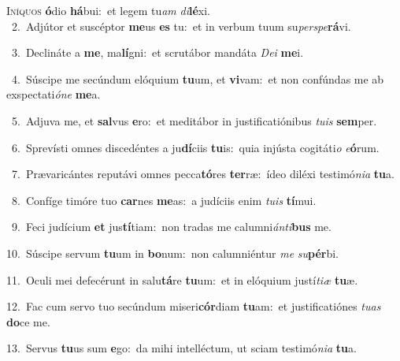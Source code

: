 \lettrine{\initial\textcolor{\initialcolor}{I}}{níquos} \textbf{ó}\-dio \textbf{há}\-bui:~\star et legem tu\textit{am} \textit{di}\-\textbf{lé}xi.\\
{\numbfont\textcolor{\numbcolor}{~2.}}~Adjútor et suscéptor \textbf{me}\-us \textbf{es} tu:~\star et in verbum tuum su\-\textit{per}\-\textit{spe}\textbf{rá}vi.\par
{\numbfont\textcolor{\numbcolor}{~3.}}~Declináte a \textbf{me}\-, ma\-\textbf{lí}\-gni:~\star et scrutábor mandáta \textit{De}\-\textit{i} \textbf{me}\-i.\par
{\numbfont\textcolor{\numbcolor}{~4.}}~Súscipe me secúndum elóquium \textbf{tu}\-um, et \textbf{vi}\-vam:~\star et non confúndas me ab exspectati\-\textit{ó}\-\textit{ne} \textbf{me}\-a.\par
{\numbfont\textcolor{\numbcolor}{~5.}}~Adjuva me, et \textbf{sal}\-vus \textbf{e}\-ro:~\star et meditábor in justificatiónibus \textit{tu}\-\textit{is} \textbf{sem}\-per.\par
{\numbfont\textcolor{\numbcolor}{~6.}}~Sprevísti omnes discedéntes a ju\-\textbf{dí}\-ciis \textbf{tu}\-is:~\star quia injústa cogitáti\textit{o} \textit{e}\-\textbf{ó}rum.\par
{\numbfont\textcolor{\numbcolor}{~7.}}~Prævaricántes reputávi omnes pecca\-\textbf{tó}\-res \textbf{ter}\-ræ:~\star ídeo diléxi testimó\-\textit{ni}\-\textit{a} \textbf{tu}\-a.\par
{\numbfont\textcolor{\numbcolor}{~8.}}~Confíge timóre tuo \textbf{car}\-nes \textbf{me}\-as:~\star a judíciis enim \textit{tu}\-\textit{is} \textbf{tí}\-mui.\par
{\numbfont\textcolor{\numbcolor}{~9.}}~Feci judícium \textbf{et} jus\-\textbf{tí}\-tiam:~\star non tradas me calumni\-\textit{án}\-\textit{ti}\textbf{bus} me.\par
{\numbfont\textcolor{\numbcolor}{10.}}~Súscipe servum \textbf{tu}\-um in \textbf{bo}\-num:~\star non calumniéntur \textit{me} \textit{su}\-\textbf{pér}bi.\par
{\numbfont\textcolor{\numbcolor}{11.}}~Oculi mei defecérunt in salu\-\textbf{tá}\-re \textbf{tu}\-um:~\star et in elóquium justí\-\textit{ti}\-\textit{æ} \textbf{tu}\-æ.\par
{\numbfont\textcolor{\numbcolor}{12.}}~Fac cum servo tuo secúndum miseri\-\textbf{cór}\-diam \textbf{tu}\-am:~\star et justificatiónes \textit{tu}\-\textit{as} \textbf{do}\-ce me.\par
{\numbfont\textcolor{\numbcolor}{13.}}~Servus \textbf{tu}\-us sum \textbf{e}\-go:~\star da mihi intelléctum, ut sciam testimó\-\textit{ni}\-\textit{a} \textbf{tu}\-a.\par
